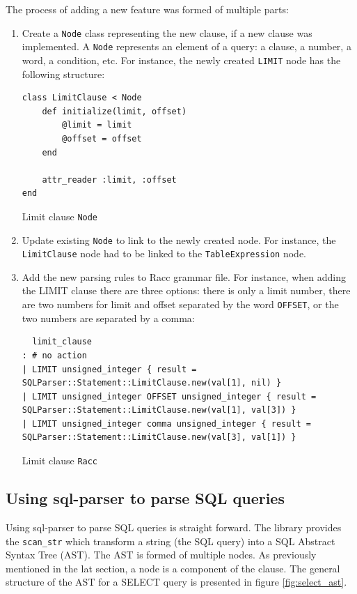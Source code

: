 The process of adding a new feature was formed of multiple parts:
\begin{enumerate}
    \item Create a \texttt{Node} class representing the new clause, if a new clause was implemented. A \texttt{Node} represents an element of a query: a clause, a number, a word, a condition, etc. For instance, the newly created \texttt{LIMIT} node has the following structure:
\begin{code}
\begin{verbatim}
class LimitClause < Node
    def initialize(limit, offset)
        @limit = limit
        @offset = offset
    end

    attr_reader :limit, :offset
end
\end{verbatim}
\caption{Limit clause \texttt{Node}}
\label{fig:limit_clause}
\end{code}
    \item Update existing \texttt{Node} to link to the newly created node. For instance, the \texttt{LimitClause} node had to be linked to the \texttt{TableExpression} node.
    \item Add the new parsing rules to Racc grammar file. For instance, when adding the LIMIT clause there are three options: there is only a limit number, there are two numbers for limit and offset separated by the word \texttt{OFFSET}, or the two numbers are separated by a comma:
    
\begin{code}
    \centering
    \begin{verbatim}
  limit_clause
: # no action
| LIMIT unsigned_integer { result = SQLParser::Statement::LimitClause.new(val[1], nil) }
| LIMIT unsigned_integer OFFSET unsigned_integer { result = SQLParser::Statement::LimitClause.new(val[1], val[3]) }
| LIMIT unsigned_integer comma unsigned_integer { result = SQLParser::Statement::LimitClause.new(val[3], val[1]) }
    \end{verbatim}
    \caption{Limit clause \texttt{Racc}}
    \label{fig:limit_clause_racc}
\end{code}
\end{enumerate}

\subsection{Using sql-parser to parse SQL queries}
Using sql-parser to parse SQL queries is straight forward. The library provides the \texttt{scan_str} which transform a string (the SQL query) into a SQL Abstract Syntax Tree (AST). The AST is formed of multiple nodes. As previously mentioned in the lat section, a node is a component of the clause. The general structure of the AST for a SELECT query is presented in figure \ref{fig:select_ast}.

